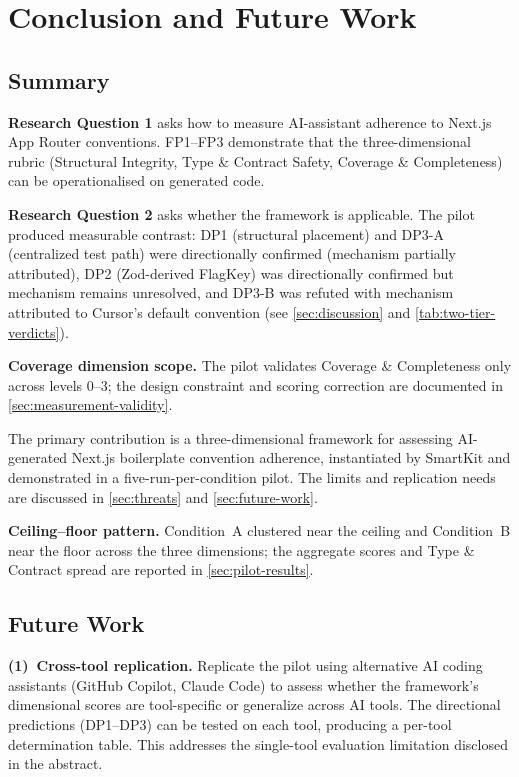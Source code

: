 \documentclass[12pt,a4paper]{report}
\begin{document}
\chapter{Conclusion and Future Work}
\label{sec:conclusion}

\section{Summary}

\textbf{Research Question 1} asks how to measure AI-assistant adherence to Next.js App Router conventions. FP1--FP3 demonstrate that the three-dimensional rubric (Structural Integrity, Type \& Contract Safety, Coverage \& Completeness) can be operationalised on generated code.

\textbf{Research Question 2} asks whether the framework is applicable. The pilot produced measurable contrast: DP1 (structural placement) and DP3-A (centralized test path) were directionally confirmed (mechanism partially attributed), DP2 (Zod-derived FlagKey) was directionally confirmed but mechanism remains unresolved, and DP3-B was refuted with mechanism attributed to Cursor's default convention (see \autoref{sec:discussion} and \autoref{tab:two-tier-verdicts}).

\textbf{Coverage dimension scope.} The pilot validates Coverage \& Completeness only across levels 0--3; the design constraint and scoring correction are documented in \autoref{sec:measurement-validity}.

The primary contribution is a three-dimensional framework for assessing AI-generated Next.js boilerplate convention adherence, instantiated by SmartKit and demonstrated in a five-run-per-condition pilot. The limits and replication needs are discussed in \autoref{sec:threats} and \autoref{sec:future-work}.

\medskip\noindent\textbf{Ceiling--floor pattern.} Condition~A clustered near the ceiling and Condition~B near the floor across the three dimensions; the aggregate scores and Type \& Contract spread are reported in \autoref{sec:pilot-results}.

\section{Future Work}
\label{sec:future-work}

\textbf{(1)~Cross-tool replication.} Replicate the pilot using alternative AI coding assistants (GitHub Copilot, Claude Code) to assess whether the framework's dimensional scores are tool-specific or generalize across AI tools. The directional predictions (DP1--DP3) can be tested on each tool, producing a per-tool determination table. This addresses the single-tool evaluation limitation disclosed in the abstract.
\end{document}
